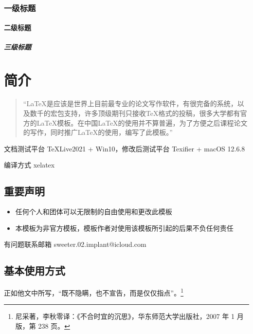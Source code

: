 \documentclass{BFSU-master-thesis}
\begin{document}
\zhlipsum[1-1]

\subsection{一级标题}

\zhlipsum[1-1]

\subsubsection{二级标题}

\zhlipsum[1-2]

\paragraph{三级标题}

\zhlipsum[1-1]

\chapter{简介}

\begin{quote}
“\LaTeX{}是应该是世界上目前最专业的论文写作软件，有很完备的系统，以及数千的宏包支持，许多顶级期刊只接收\TeX{}格式的投稿，很多大学都有官方的\LaTeX{}模板。在中国\LaTeX{}的使用并不算普遍，为了方便之后课程论文的写作，同时推广\LaTeX{}的使用，编写了此模板。”
\end{quote}


文档测试平台 TeXLive2021  + Win10，修改后测试平台 Texifier + macOS 12.6.8

编译方式 xelatex

\section{重要声明}

\begin{itemize}
\item 任何个人和团体可以无限制的自由使用和更改此模板
\item 本模板为非官方模板，模板作者对使用该模板所引起的后果不负任何责任
\end{itemize}

有问题联系邮箱 sweeter.02.implant@icloud.com

\section{基本使用方式}

正如他文中所写，“既不隐瞒，也不宣告，而是仅仅指点”。\footnote{尼采著，李秋零译：《不合时宜的沉思》，华东师范大学出版社，2007 年 1 月版，第 238 页。}
\end{document}
